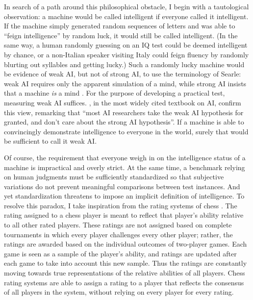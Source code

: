 In search of a path around this philosophical obstacle, I begin with a tautological observation: a machine would be called intelligent if everyone called it intelligent. If the machine simply generated random sequences of letters and was able to ``feign intelligence'' by random luck, it would still be called intelligent. (In the same way, a human randomly guessing on an IQ test could be deemed intelligent by chance, or a non-Italian speaker visiting Italy could feign fluency by randomly blurting out syllables and getting lucky.) Such a randomly lucky machine would be evidence of weak AI, but not of strong AI, to use the terminology of Searle: weak AI requires only the apparent simulation of a mind, while strong AI insists that a machine \textit{is} a mind \citep{searle1980minds}. For the purpose of developing a practical test, measuring weak AI suffices. \citet{russell1995modern}, in the most widely cited textbook on AI, confirm this view, remarking that ``most AI researchers take the weak AI hypothesis for granted, and don't care about the strong AI hypothesis''. If a machine is able to convincingly demonstrate intelligence to everyone in the world, surely that would be sufficient to call it weak AI.

Of course, the requirement that everyone weigh in on the intelligence status of a machine is impractical and overly strict. At the same time, a benchmark relying on human judgments must be sufficiently standardized so that subjective variations do not prevent meaningful comparisons between test instances. And yet standardization threatens to impose an implicit definition of intelligence. To resolve this paradox, I take inspiration from the rating systems of chess  \citep{glickman1995chess}. The rating assigned to a chess player is meant to reflect that player's ability relative to all other rated players. These ratings are not assigned based on complete tournaments in which every player challenges every other player; rather, the ratings are awarded based on the individual outcomes of two-player games. Each game is seen as a sample of the player's ability, and ratings are updated after each game to take into account this new sample. Thus the ratings are constantly moving towards true representations of the relative abilities of all players. Chess rating systems are able to assign a rating to a player that reflects the consensus of all players in the system, without relying on every player for every rating.

